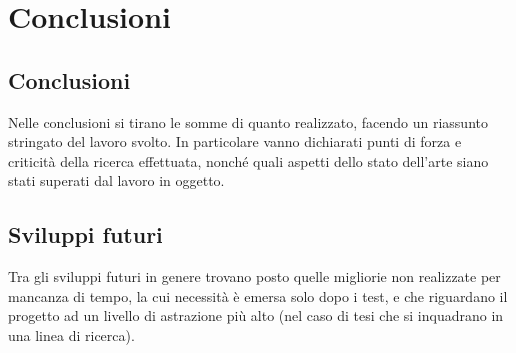 \chapter{Conclusioni}
\label{cap6}

\section{Conclusioni}

Nelle conclusioni si tirano le somme di quanto realizzato, facendo un riassunto stringato del lavoro svolto. In particolare vanno dichiarati punti di forza e criticità della ricerca effettuata, nonché quali aspetti dello stato dell'arte siano stati superati dal lavoro in oggetto.

\section{Sviluppi futuri}

Tra gli sviluppi futuri in genere trovano posto quelle migliorie non realizzate per mancanza di tempo, la cui necessità è emersa solo dopo i test, e che riguardano il progetto ad un livello di astrazione più alto (nel caso di tesi che si inquadrano in una linea di ricerca).
